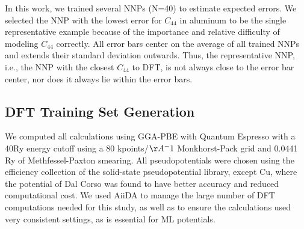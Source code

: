 \documentclass{article}
\begin{document}
In this work, we trained several NNPs (N=40) to estimate expected errors. We selected the NNP with the lowest error for $C_{44}$ in aluminum to be the single representative example because of the importance and relative difficulty of modeling $C_{44}$ correctly. All error bars center on the average of all trained NNPs and extends their standard deviation outwards. Thus, the representative NNP, i.e., the NNP with the closest $C_{44}$ to DFT, is not always close to the error bar center, nor does it always lie within the error bars. 


\subsection{DFT Training Set Generation}
We computed all calculations using GGA-PBE\cite{Perdew1996} with Quantum Espresso\cite{Giannozzi2009} with a 40Ry energy cutoff using a 80 kpoints/$\AA^-1$ Monkhorst-Pack grid\cite{Pack1977SpecialIntegrations} and 0.0441
Ry of Methfessel-Paxton smearing\cite{Methfessel1989High-precisionMetals}.
All pseudopotentials were chosen using the efficiency collection of the solid-state pseudopotential library\cite{Prandini2018}, except Cu, where the potential of Dal Corso\cite{DalCorso2014}
was found to have better accuracy and reduced computational cost.
We used AiiDA\cite{Pizzi2016} to manage the large number of DFT computations needed for this study, as well as to ensure the calculations used very consistent settings, as is essential for ML potentials\cite{Dragoni2018AchievingIron}.
\end{document}
